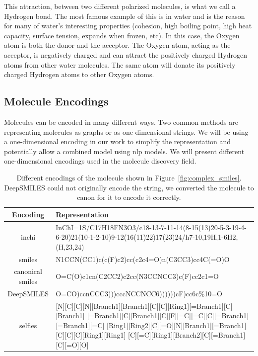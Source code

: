 \documentclass[../Document.tex]{subfiles}
\begin{document}
This attraction, between two different polarized molecules, is what we call a Hydrogen bond. The most famous example of this is in water and is the reason for many of water's interesting properties (cohesion, high boiling point, high heat capacity, surface tension, expands when frozen, etc). In this case, the Oxygen atom is both the donor and the acceptor. The Oxygen atom, acting as the acceptor, is negatively charged and can attract the positively charged Hydrogen atoms from other water molecules. The same atom will donate its positively charged Hydrogen atoms to other Oxygen atoms.


\subsection{Molecule Encodings}
\label{sec:molecule-encodings}
Molecules can be encoded in many different ways. Two common methods are representing molecules as graphs or as one-dimensional strings.
We will be using a one-dimensional encoding in our work to simplify the representation and potentially allow a combined model using \gls{nlp} models.
We will present different one-dimensional encodings used in the molecule discovery field.


\begin{table}[t]
    \centering
    \begin{tabular}{|c|p{5in}|}
        \hline
        Encoding & Representation \\
        \hline
        \acrshort{inchi} & InChI=1S/C17H18FN3O3/c18-13-7-11-14(8-15(13)20-5-3-19-4-6-20)21(10-1-2-10)9-12(16(11)22)17(23)24/h7-10,19H,1-6H2,(H,23,24)\\
        \hline
        \acrshort{smiles} & 
        N1CCN(CC1)c(c(F)c2)cc(c2c4=O)n(C3CC3)cc4C(=O)O
        \\
        \hline
        canonical \acrshort{smiles} & O=C(O)c1cn(C2CC2)c2cc(N3CCNCC3)c(F)cc2c1=O\\
        \hline
        DeepSMILES & O=CO)ccnCCC3)))cccNCCNCC6))))))cF)cc6c\%10=O\\
        \hline
        \acrshort{selfies} & [N][C][C][N][Branch1][Branch1][C][C][Ring1][=Branch1][C][Branch1]
        [=Branch1][C][Branch1][C][F][=C][=C][C][=Branch1][=Branch1][=C]
        [Ring1][Ring2][C][=O][N][Branch1][=Branch1][C][C][C][Ring1][Ring1]
        [C][=C][Ring1][Branch2][C][=Branch1][C][=O][O]\\
        \hline
    \end{tabular}
    \caption[Different encodings of the molecule shown in Figure~\ref{fig:complex_smiles}]{Different encodings of the molecule shown in Figure~\ref{fig:complex_smiles}. DeepSMILES could not originally encode the \smiles string, we converted the molecule to canon \smiles for it to encode it correctly.}
    \label{tab:different_encodings}
\end{table}
\end{document}
